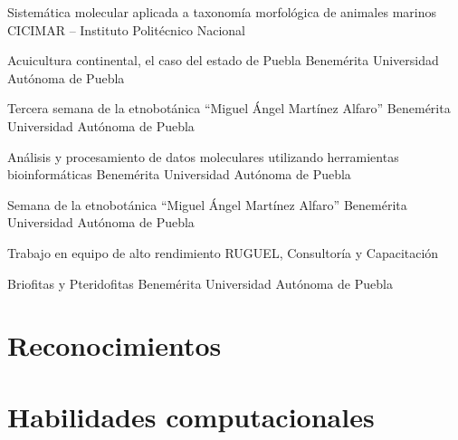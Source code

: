 \documentclass[11pt, letterpaper, roman]{moderncv}
\begin{document}
		{Sistemática molecular aplicada a taxonomía morfológica de animales 
		marinos}
		{\newline CICIMAR -- Instituto Politécnico Nacional}
		{}
		{}
		{}

		{Acuicultura continental, el caso del estado de Puebla}
		{\newline Benemérita Universidad Autónoma de Puebla}
		{}
		{}
		{}

		{Tercera semana de la etnobotánica ``Miguel Ángel Martínez Alfaro''}
		{\newline Benemérita Universidad Autónoma de Puebla}
		{}
		{}
		{}

		{Análisis y procesamiento de datos moleculares utilizando herramientas 
		bioinformáticas}
		{\newline Benemérita Universidad Autónoma de Puebla}
		{}
		{}
		{}

		{Semana de la etnobotánica ``Miguel Ángel Martínez Alfaro''}
		{\newline Benemérita Universidad Autónoma de Puebla}
		{}
		{}
		{}

		{Trabajo en equipo de alto rendimiento}
		{\newline RUGUEL, Consultoría y Capacitación}
		{}
		{}
		{}

		{Briofitas y Pteridofitas}
		{\newline Benemérita Universidad Autónoma de Puebla}
		{}
		{}
		{}


\section{Reconocimientos}



\section{Habilidades computacionales}
\end{document}
